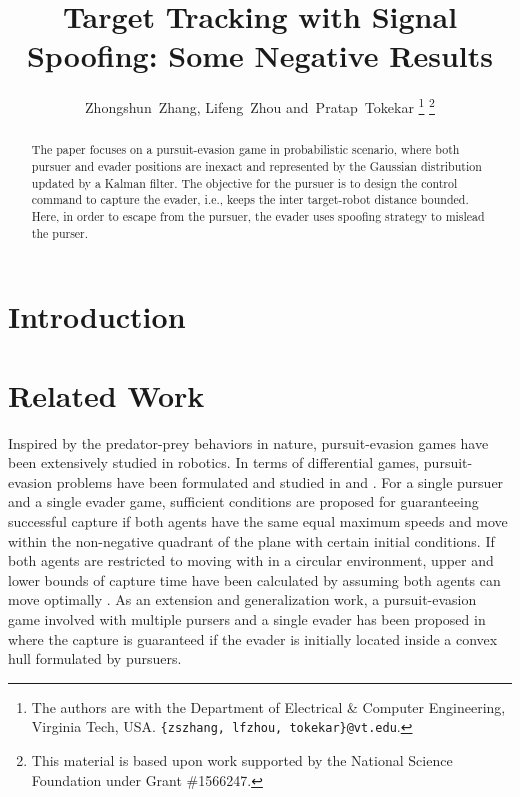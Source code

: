 \documentclass[letterpaper, 10 pt, conference]{ieeeconf}  %
\title{\LARGE\bf Target Tracking with Signal Spoofing: Some Negative Results}%
\author{Zhongshun~Zhang, 
        Lifeng~Zhou
        and~Pratap~Tokekar%
\thanks{The authors are with the Department of Electrical \& Computer Engineering, Virginia Tech, USA. \texttt{\small \{zszhang, lfzhou, tokekar\}@vt.edu}.}%
\thanks{This material is based upon work supported by the National Science Foundation under Grant \#1566247.}}
\begin{document}
\maketitle
\thispagestyle{empty}
\pagestyle{empty}


\begin{abstract}

The paper focuses on a pursuit-evasion game in probabilistic scenario, where both pursuer and evader positions are inexact and represented by the Gaussian distribution updated by a Kalman filter. The objective for the pursuer is to design the control command to capture the evader, i.e., keeps the inter target-robot distance bounded. Here, in order to escape from the pursuer, the  evader uses spoofing strategy to mislead the purser. 

\end{abstract}


\section{Introduction}


\section{Related Work} \label{sec:relwork}
Inspired by the predator-prey
behaviors in nature, pursuit-evasion games have been extensively studied in robotics\cite{pais2010pursuit}. In terms of differential games, pursuit-evasion problems have been formulated and studied in \cite{isaacs1999differential} and \cite{basar1999dynamic}. For a single pursuer and a single evader game\cite{sgall2001solution}, sufficient conditions are proposed for guaranteeing successful capture if both agents have the same equal maximum speeds and move within the non-negative quadrant of the plane with certain initial conditions. If both agents are restricted to moving with in a circular environment, upper and lower bounds of capture time have been calculated by assuming both agents can move optimally \cite{alonso1992lion}. As an extension and generalization work, a pursuit-evasion game involved with multiple pursers and a single evader has been proposed in\cite{kopparty2005framework} where the capture is guaranteed if the evader is initially located
inside a convex hull formulated by pursuers. 
\end{document}
